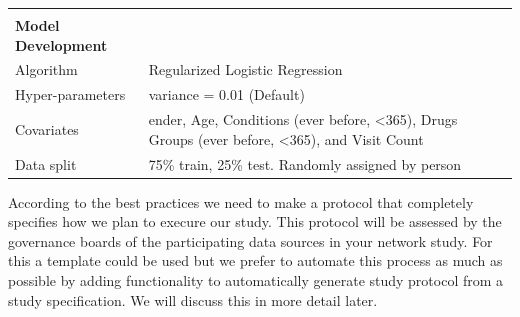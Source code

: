 \documentclass[]{article}
\begin{document}
\begin{longtable}[]{@{}ll@{}}
\begin{minipage}[t]{0.42\columnwidth}\raggedright\strut
\strut
\end{minipage} & \begin{minipage}[t]{0.51\columnwidth}\raggedright\strut
\strut
\end{minipage}\tabularnewline
\begin{minipage}[t]{0.42\columnwidth}\raggedright\strut
\textbf{Model Development}\strut
\end{minipage} & \begin{minipage}[t]{0.51\columnwidth}\raggedright\strut
\strut
\end{minipage}\tabularnewline
\begin{minipage}[t]{0.42\columnwidth}\raggedright\strut
Algorithm\strut
\end{minipage} & \begin{minipage}[t]{0.51\columnwidth}\raggedright\strut
Regularized Logistic Regression\strut
\end{minipage}\tabularnewline
\begin{minipage}[t]{0.42\columnwidth}\raggedright\strut
Hyper-parameters\strut
\end{minipage} & \begin{minipage}[t]{0.51\columnwidth}\raggedright\strut
variance = 0.01 (Default)\strut
\end{minipage}\tabularnewline
\begin{minipage}[t]{0.42\columnwidth}\raggedright\strut
Covariates\strut
\end{minipage} & \begin{minipage}[t]{0.51\columnwidth}\raggedright\strut
ender, Age, Conditions (ever before, \textless{}365), Drugs Groups (ever
before, \textless{}365), and Visit Count\strut
\end{minipage}\tabularnewline
\begin{minipage}[t]{0.42\columnwidth}\raggedright\strut
Data split\strut
\end{minipage} & \begin{minipage}[t]{0.51\columnwidth}\raggedright\strut
75\% train, 25\% test. Randomly assigned by person\strut
\end{minipage}\tabularnewline
\bottomrule
\end{longtable}

According to the best practices we need to make a protocol that
completely specifies how we plan to execure our study. This protocol
will be assessed by the governance boards of the participating data
sources in your network study. For this a template could be used but we
prefer to automate this process as much as possible by adding
functionality to automatically generate study protocol from a study
specification. We will discuss this in more detail later.
\end{document}
